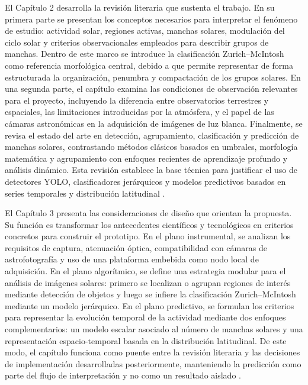 El Capítulo 2 desarrolla la revisión literaria que sustenta el trabajo. En su primera parte se presentan los conceptos necesarios para interpretar el fenómeno de estudio: actividad solar, regiones activas, manchas solares, modulación del ciclo solar y criterios observacionales empleados para describir grupos de manchas. Dentro de este marco se introduce la clasificación Zurich--McIntosh como referencia morfológica central, debido a que permite representar de forma estructurada la organización, penumbra y compactación de los grupos solares. En una segunda parte, el capítulo examina las condiciones de observación relevantes para el proyecto, incluyendo la diferencia entre observatorios terrestres y espaciales, las limitaciones introducidas por la atmósfera, y el papel de las cámaras astronómicas en la adquisición de imágenes de luz blanca. Finalmente, se revisa el estado del arte en detección, agrupamiento, clasificación y predicción de manchas solares, contrastando métodos clásicos basados en umbrales, morfología matemática y agrupamiento con enfoques recientes de aprendizaje profundo y análisis dinámico. Esta revisión establece la base técnica para justificar el uso de detectores YOLO, clasificadores jerárquicos y modelos predictivos basados en series temporales y distribución latitudinal \citep{ultralyticsYOLO26,sayez2023sunscc,podladchikova2012kalman}.

El Capítulo 3 presenta las consideraciones de diseño que orientan la propuesta. Su función es transformar los antecedentes científicos y tecnológicos en criterios concretos para construir el prototipo. En el plano instrumental, se analizan los requisitos de captura, atenuación óptica, compatibilidad con cámaras de astrofotografía y uso de una plataforma embebida como nodo local de adquisición. En el plano algorítmico, se define una estrategia modular para el análisis de imágenes solares: primero se localizan o agrupan regiones de interés mediante detección de objetos y luego se infiere la clasificación Zurich--McIntosh mediante un modelo jerárquico. En el plano predictivo, se formulan los criterios para representar la evolución temporal de la actividad mediante dos enfoques complementarios: un modelo escalar asociado al número de manchas solares y una representación espacio-temporal basada en la distribución latitudinal. De este modo, el capítulo funciona como puente entre la revisión literaria y las decisiones de implementación desarrolladas posteriormente, manteniendo la predicción como parte del flujo de interpretación y no como un resultado aislado \citep{schmid2010dmd,kutz2016dmd}.

